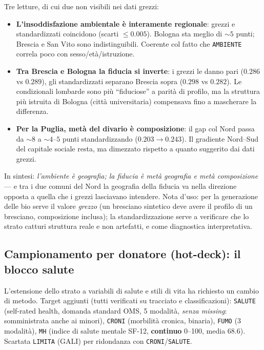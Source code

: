 \documentclass[11pt,a4paper]{article}
\newcommand{\code}[1]{\texttt{#1}}
\begin{document}
\noindent Tre letture, di cui due non visibili nei dati grezzi:
\begin{itemize}[leftmargin=*,itemsep=1pt]
  \item \textbf{L'insoddisfazione ambientale \`e interamente regionale}:
  grezzi e standardizzati coincidono (scarti $\le0.005$). Bologna sta
  meglio di $\sim5$ punti; Brescia e San Vito sono indistinguibili. Coerente
  col fatto che \code{AMBIENTE} correla poco con sesso/et\`a/istruzione.
  \item \textbf{Tra Brescia e Bologna la fiducia si inverte}: i grezzi le
  danno pari ($0.286$ vs $0.289$), gli standardizzati separano Brescia
  sopra ($0.298$ vs $0.282$). Le condizionali lombarde sono pi\`u
  ``fiduciose'' a parit\`a di profilo, ma la struttura pi\`u istruita di
  Bologna (citt\`a universitaria) compensava fino a mascherare la
  differenza.
  \item \textbf{Per la Puglia, met\`a del divario \`e composizione}: il gap
  col Nord passa da $\sim8$ a $\sim4$--$5$ punti standardizzando
  ($0.203\to0.243$). Il gradiente Nord--Sud del capitale sociale resta,
  ma dimezzato rispetto a quanto suggerito dai dati grezzi.
\end{itemize}
\noindent In sintesi: \emph{l'ambiente \`e geografia; la fiducia \`e
met\`a geografia e met\`a composizione} --- e tra i due comuni del Nord
la geografia della fiducia va nella direzione opposta a quella che i
grezzi lasciavano intendere. Nota d'uso: per la generazione delle bio
serve il valore \emph{grezzo} (un bresciano sintetico deve avere il
profilo di un bresciano, composizione inclusa); la standardizzazione
serve a verificare che lo strato catturi struttura reale e non artefatti,
e come diagnostica interpretativa.

\subsection{Campionamento per donatore (hot-deck): il blocco salute}
\label{sec:avq-donor}
L'estensione dello strato a variabili di salute e stili di vita ha
richiesto un cambio di metodo. Target aggiunti (tutti verificati su
tracciato e classificazioni): \code{SALUTE} (self-rated health, domanda
standard OMS, 5 modalit\`a, \emph{senza missing}: somministrata anche ai
minori), \code{CRONI} (morbilit\`a cronica, binaria), \code{FUMO} (3
modalit\`a), \code{MH} (indice di salute mentale SF-12, \textbf{continuo}
0--100, media 68.6). Scartata \code{LIMITA} (GALI) per ridondanza con
\code{CRONI}/\code{SALUTE}.
\end{document}
